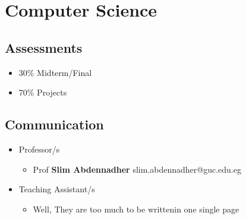 \documentclass[11pt]{article}
\begin{document}
\section{Computer Science}
\begin{multicols}{2}
\subsection{Assessments}

\begin{itemize}
\item 30\% Midterm/Final
\item 70\% Projects
\end{itemize}
\subsection{Communication}
\begin{itemize}

\item Professor/s 
\begin{itemize}

	\item Prof \textbf{Slim Abdennadher}  slim.abdennadher@guc.edu.eg  

\end{itemize}
\item Teaching Assistant/s
\begin{itemize}

\item Well, They are too much to be writtenin one single page
\end{itemize}
\end{itemize}
\end{multicols}
\end{document}
